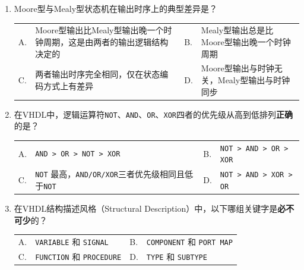 \begin{enumerate}[label=\arabic*.]
\vspace{0.8cm}

\item Moore型与Mealy型状态机在输出时序上的典型差异是？

\vspace{0.3cm}

\begin{tabular}{@{}lp{}@{\qquad}lp{}@{}}
A. & Moore型输出比Mealy型输出晚一个时钟周期，这是由两者的输出逻辑结构决定的 &
B. & Mealy型输出总是比Moore型输出晚一个时钟周期 \\
C. & 两者输出时序完全相同，仅在状态编码方式上有差异 &
D. & Moore型输出与时钟无关，Mealy型输出与时钟同步 \\
\end{tabular}

\vspace{0.8cm}

\item 在VHDL中，逻辑运算符\texttt{NOT}、\texttt{AND}、\texttt{OR}、\texttt{XOR}四者的优先级从高到低排列\textbf{正确}的是？

\vspace{0.3cm}

\begin{tabular}{@{}lp{}@{\qquad}lp{}@{}}
A. & \texttt{AND > OR > NOT > XOR} &
B. & \texttt{NOT > AND > OR > XOR} \\
C. & \texttt{NOT} 最高，\texttt{AND/OR/XOR}三者优先级相同且低于\texttt{NOT} &
D. & \texttt{NOT > AND > XOR > OR} \\
\end{tabular}

\vspace{0.8cm}

\item 在VHDL结构描述风格（Structural Description）中，以下哪组关键字是\textbf{必不可少}的？

\vspace{0.3cm}

\begin{tabular}{@{}lp{}@{\qquad}lp{}@{}}
A. & \texttt{VARIABLE} 和 \texttt{SIGNAL} &
B. & \texttt{COMPONENT} 和 \texttt{PORT MAP} \\
C. & \texttt{FUNCTION} 和 \texttt{PROCEDURE} &
D. & \texttt{TYPE} 和 \texttt{SUBTYPE} \\
\end{tabular}

\end{enumerate}

